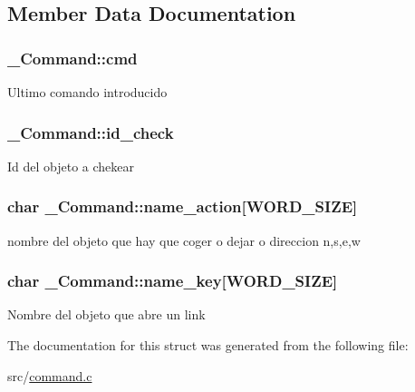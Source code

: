 \subsection{Member Data Documentation}
\hypertarget{struct__Command_a61f89a0ef775ee09992b647cb25029c4}{
\subsubsection[{cmd}]{ \+\_\+\+Command\+::cmd}}\label{struct__Command_a61f89a0ef775ee09992b647cb25029c4}
Ultimo comando introducido \hypertarget{struct__Command_adc4d5ed3a25bef9cd4a42742aa2ffc10}{
\subsubsection[{id\+\_\+check}]{ \+\_\+\+Command\+::id\+\_\+check}}\label{struct__Command_adc4d5ed3a25bef9cd4a42742aa2ffc10}
Id del objeto a chekear \hypertarget{struct__Command_a150c0602ca49194027822cc452b0bbf9}{
\subsubsection[{name\+\_\+action}]{\setlength{\rightskip}{0pt plus 5cm}char \+\_\+\+Command\+::name\+\_\+action\mbox{[}{\bf W\+O\+R\+D\+\_\+\+S\+I\+Z\+E}\mbox{]}}}\label{struct__Command_a150c0602ca49194027822cc452b0bbf9}
nombre del objeto que hay que coger o dejar o direccion n,s,e,w \hypertarget{struct__Command_a855e97a299b38e0d729cee1299a44ca9}{
\subsubsection[{name\+\_\+key}]{\setlength{\rightskip}{0pt plus 5cm}char \+\_\+\+Command\+::name\+\_\+key\mbox{[}{\bf W\+O\+R\+D\+\_\+\+S\+I\+Z\+E}\mbox{]}}}\label{struct__Command_a855e97a299b38e0d729cee1299a44ca9}
Nombre del objeto que abre un link 

The documentation for this struct was generated from the following file\+:\begin{DoxyCompactItemize}
\item 
src/\hyperlink{command_8c}{command.\+c}\end{DoxyCompactItemize}
